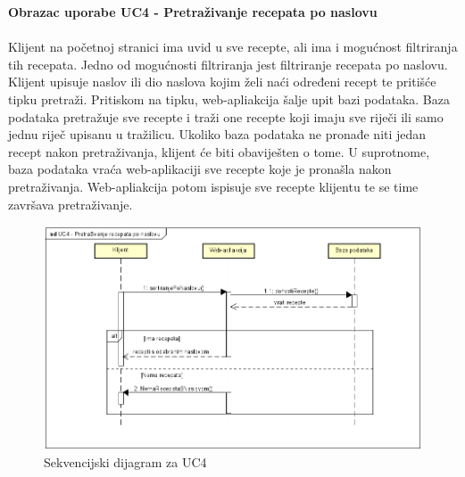 \noindent\textbf{Obrazac uporabe UC4 - Pretraživanje recepata po naslovu}\\\\
Klijent na početnoj stranici ima uvid u sve recepte, ali ima i mogućnost filtriranja tih recepata.
Jedno od mogućnosti filtriranja jest filtriranje recepata po naslovu.
Klijent upisuje naslov ili dio naslova kojim želi naći određeni recept te pritišće tipku pretraži.
Pritiskom na tipku, web-apliakcija šalje upit bazi podataka.
Baza podataka pretražuje sve recepte i traži one recepte koji imaju sve riječi ili samo jednu riječ upisanu u tražilicu.
Ukoliko baza podataka ne pronađe niti jedan recept nakon pretraživanja, klijent će biti obaviješten o tome.
U suprotnome, baza podataka vraća web-aplikaciji sve recepte koje je pronašla nakon pretraživanja.
Web-apliakcija potom ispisuje sve recepte klijentu te se time završava pretraživanje.
\begin{figure}[H]
	\includegraphics[scale=0.8]{slike/Slika7.png} %
	\centering
	\caption{Sekvencijski dijagram za UC4}
	\label{fig:promjene}
\end{figure}
\pagebreak


